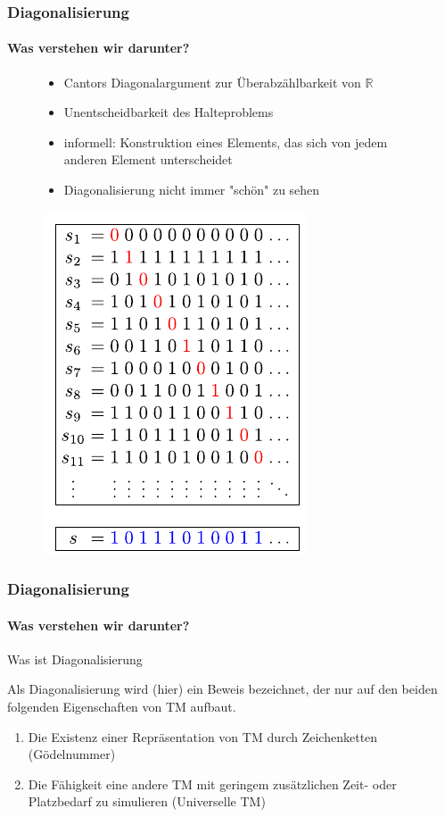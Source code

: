 \begin{frame}
	\frametitle{Diagonalisierung}
	\framesubtitle{Was verstehen wir darunter?}
	
	
	


	\begin{figure}
			\begin{minipage}{0.8\linewidth}
				\begin{itemize}[<+->]
					\item Cantors Diagonalargument zur Überabzählbarkeit von $ \mathbb{R}$
					\item Unentscheidbarkeit des Halteproblems
					\item informell: Konstruktion eines Elements, das sich von jedem anderen Element unterscheidet
					\item Diagonalisierung nicht immer "schön" zu sehen
				\end{itemize}
			\end{minipage}
			\begin{minipage}{0.1\linewidth}
					\includegraphics[scale = 0.4]{images/Diagonal_argument_svg.pdf}%
			\end{minipage}
		\end{figure}
	
\end{frame}
\begin{frame}
	\frametitle{Diagonalisierung}
	\framesubtitle{Was verstehen wir darunter?}
	\begin{KITinfoblock}{Was ist Diagonalisierung} {
			Als Diagonalisierung wird (hier) ein Beweis bezeichnet, der nur auf den beiden folgenden
			Eigenschaften von TM aufbaut.
			
			\begin{enumerate}
				\item<2-> Die Existenz einer Repräsentation von TM durch Zeichenketten (Gödelnummer)
				\item<3-> Die Fähigkeit eine andere TM mit geringem zusätzlichen Zeit- oder Platzbedarf zu simulieren (Universelle TM)
			\end{enumerate}		
		}
	\end{KITinfoblock}
	
\end{frame}